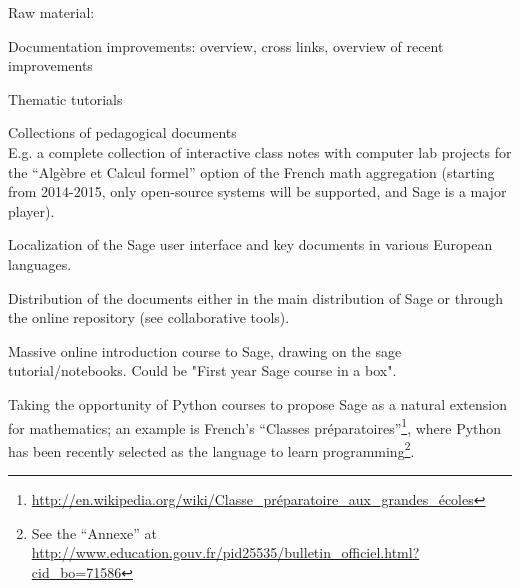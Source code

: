 \begin{workpackage}
Raw material:
\begin{compactitem}
\item Documentation improvements: overview, cross links, overview of
  recent improvements
\item Thematic tutorials
\item Collections of pedagogical documents\\
  E.g. a complete collection of interactive class notes with computer
  lab projects for the ``Algèbre et Calcul formel'' option of the
  French math aggregation (starting from 2014-2015, only open-source
  systems will be supported, and Sage is a major player).
\item Localization of the Sage user interface and key documents in
  various European languages.
\item Distribution of the documents either in the main distribution of
  Sage or through the online repository (see collaborative tools).
\item Massive online introduction course to Sage, drawing on the sage tutorial/notebooks.
Could be "First year Sage course in a box".
\item Taking the opportunity of Python courses to propose Sage as a natural extension
for mathematics; an example is French's
``Classes pr\'eparatoires''\footnote{
\url{http://en.wikipedia.org/wiki/Classe_préparatoire_aux_grandes_écoles}},
where Python has been recently selected as the language to learn programming\footnote{See
the ``Annexe'' at
\url{http://www.education.gouv.fr/pid25535/bulletin_officiel.html?cid_bo=71586}}.
\end{compactitem}



\end{workpackage}
